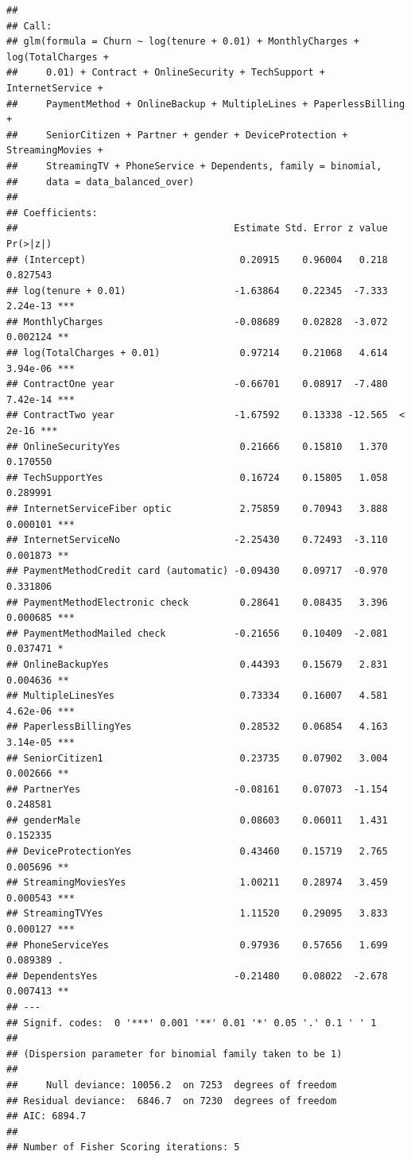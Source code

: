 \documentclass[
  twoside]{article}
\begin{document}
\begin{verbatim}
## 
## Call:
## glm(formula = Churn ~ log(tenure + 0.01) + MonthlyCharges + log(TotalCharges + 
##     0.01) + Contract + OnlineSecurity + TechSupport + InternetService + 
##     PaymentMethod + OnlineBackup + MultipleLines + PaperlessBilling + 
##     SeniorCitizen + Partner + gender + DeviceProtection + StreamingMovies + 
##     StreamingTV + PhoneService + Dependents, family = binomial, 
##     data = data_balanced_over)
## 
## Coefficients:
##                                      Estimate Std. Error z value Pr(>|z|)    
## (Intercept)                           0.20915    0.96004   0.218 0.827543    
## log(tenure + 0.01)                   -1.63864    0.22345  -7.333 2.24e-13 ***
## MonthlyCharges                       -0.08689    0.02828  -3.072 0.002124 ** 
## log(TotalCharges + 0.01)              0.97214    0.21068   4.614 3.94e-06 ***
## ContractOne year                     -0.66701    0.08917  -7.480 7.42e-14 ***
## ContractTwo year                     -1.67592    0.13338 -12.565  < 2e-16 ***
## OnlineSecurityYes                     0.21666    0.15810   1.370 0.170550    
## TechSupportYes                        0.16724    0.15805   1.058 0.289991    
## InternetServiceFiber optic            2.75859    0.70943   3.888 0.000101 ***
## InternetServiceNo                    -2.25430    0.72493  -3.110 0.001873 ** 
## PaymentMethodCredit card (automatic) -0.09430    0.09717  -0.970 0.331806    
## PaymentMethodElectronic check         0.28641    0.08435   3.396 0.000685 ***
## PaymentMethodMailed check            -0.21656    0.10409  -2.081 0.037471 *  
## OnlineBackupYes                       0.44393    0.15679   2.831 0.004636 ** 
## MultipleLinesYes                      0.73334    0.16007   4.581 4.62e-06 ***
## PaperlessBillingYes                   0.28532    0.06854   4.163 3.14e-05 ***
## SeniorCitizen1                        0.23735    0.07902   3.004 0.002666 ** 
## PartnerYes                           -0.08161    0.07073  -1.154 0.248581    
## genderMale                            0.08603    0.06011   1.431 0.152335    
## DeviceProtectionYes                   0.43460    0.15719   2.765 0.005696 ** 
## StreamingMoviesYes                    1.00211    0.28974   3.459 0.000543 ***
## StreamingTVYes                        1.11520    0.29095   3.833 0.000127 ***
## PhoneServiceYes                       0.97936    0.57656   1.699 0.089389 .  
## DependentsYes                        -0.21480    0.08022  -2.678 0.007413 ** 
## ---
## Signif. codes:  0 '***' 0.001 '**' 0.01 '*' 0.05 '.' 0.1 ' ' 1
## 
## (Dispersion parameter for binomial family taken to be 1)
## 
##     Null deviance: 10056.2  on 7253  degrees of freedom
## Residual deviance:  6846.7  on 7230  degrees of freedom
## AIC: 6894.7
## 
## Number of Fisher Scoring iterations: 5
\end{verbatim}
\end{document}
